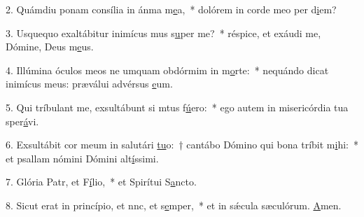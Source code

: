 2. Quámdiu ponam consília in ánma m\uline{e}a,~* dolórem in corde meo per d\uline{i}em?\par 
3. Usquequo exaltábitur inimícus mus s\uline{u}per me?~* réspice, et exáudi me, Dómine, Deus m\uline{e}us.\par 
4. Illúmina óculos meos ne umquam obdórmim in m\uline{o}rte:~* nequándo dicat inimícus meus: præválui advérsus \uline{e}um.\par 
5. Qui tríbulant me, exsultábunt si mtus f\uline{ú}ero:~* ego autem in misericórdia tua sper\uline{á}vi.\par 
6. Exsultábit cor meum in salutári \uline{tu}o:~† cantábo Dómino qui bona tríbit m\uline{i}hi:~* et psallam nómini Dómini alt\uline{í}ssimi.\par 
7. Glória Patr, et F\uline{í}lio,~* et Spirítui S\uline{a}ncto.\par 
8. Sicut erat in princípio, et nnc, et s\uline{e}mper,~* et in sǽcula sæculórum. \uline{A}men.\par 
